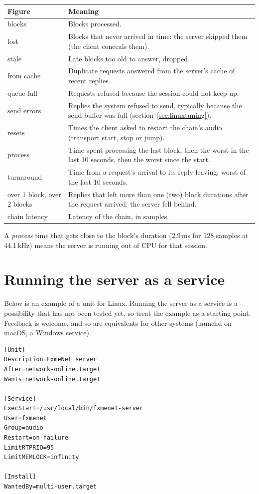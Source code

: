 \begin{longtable}{@{}p{}p{}@{}}
\toprule
\textbf{Figure} & \textbf{Meaning}\\
\midrule
\endhead
blocks & Blocks processed.\\
lost & Blocks that never arrived in time: the server skipped them (the client conceals them).\\
stale & Late blocks too old to answer, dropped.\\
from cache & Duplicate requests answered from the server's cache of recent replies.\\
queue full & Requests refused because the session could not keep up.\\
send errors & Replies the system refused to send, typically because the send buffer was full (section~\ref{sec:linuxtuning}).\\
resets & Times the client asked to restart the chain's audio (transport start, stop or jump).\\
process & Time spent processing the last block, then the worst in the last 10 seconds, then the worst since the start.\\
turnaround & Time from a request's arrival to its reply leaving, worst of the last 10 seconds.\\
over 1 block, over 2 blocks & Replies that left more than one (two) block durations after the request arrived: the server fell behind.\\
chain latency & Latency of the chain, in samples.\\
\bottomrule
\end{longtable}

A \emph{process} time that gets close to the block's duration (2.9\,ms for 128
samples at 44.1\,kHz) means the server is running out of CPU for that
session.

\section{Running the server as a service}

Below is an example of a  unit for Linux. Running the server as a service is a possibility that has not been tested yet, so treat the example as a starting point. Feedback is welcome, and so are equivalents for other systems (launchd on macOS, a Windows service).

\begin{lstlisting}[language={}]
[Unit]
Description=FxmeNet server
After=network-online.target
Wants=network-online.target

[Service]
ExecStart=/usr/local/bin/fxmenet-server
User=fxmenet
Group=audio
Restart=on-failure
LimitRTPRIO=95
LimitMEMLOCK=infinity

[Install]
WantedBy=multi-user.target
\end{lstlisting}

